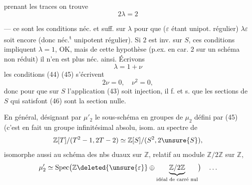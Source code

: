 prenant les traces on trouve
\[
  2\lambda=2 \tag{45}
\]

--- ce sont les conditions néc. et suff. sur $\lambda$ pour que
\deleted{\unsure{$\lambda$}}
($\varepsilon$ étant unipot. régulier)
$\lambda\varepsilon$ soit encore 
 (donc néc.\textsuperscript{t} unipotent régulier).
Si $2$ est inv. sur $S$, 
ces conditions impliquent $\lambda=1$, OK, mais
 de cette hypothèse (p.ex. en car. $2$
 sur un schéma non réduit) il n'en est plus néc. ainsi. Écrivons
\[
  \lambda=1+\nu
\]
les conditions (44) (45) s'écrivent
\[
  2\nu=0,\quad \nu^2=0, \tag{46}
\]
donc pour que sur $S$ l'application (43) soit injection, il f. et s.
que les  sections de $S$ qui satisfont (46)
sont la section nulle.

En général, désignant par $\mu'_2$ le sous-schéma
en groupes de $\mu_2$ défini par (45)
(c'est en fait un  groupe infinitésimal absolu,
 
isom. au spectre de
\[
  \mathbb Z[T]/(T^2-1,2T-2)\simeq
  \mathbb Z[S]/(S^2,2\unsure{S}),
\]
isomorphe aussi au schéma des nbs duaux sur $\mathbb Z$,
relatif au module $\mathbb Z/2\mathbb Z$ sur $\mathbb Z$,
\[
  \mu'_2\simeq\operatorname{Spec}
  \bigl(\mathbb Z\deleted{\unsure{\varepsilon}}\oplus\underbrace{\mathbb Z/2\mathbb Z}_{\text{idéal de carré nul}}\bigr)
  \quad\ldots
\]


